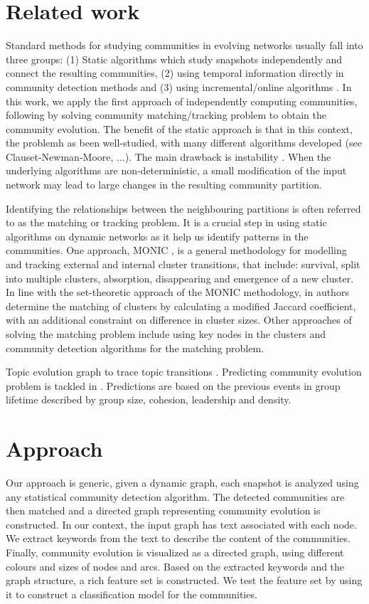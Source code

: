 \documentclass{article} %
\begin{document}
\section{Related work}
Standard methods for studying communities in evolving networks usually fall into three groups: (1) Static algorithms which study snapshots independently  and connect the resulting communities, (2) using temporal information directly in community detection methods and (3) using incremental/online algorithms \cite{aynaud}. In this work, we apply the first approach of independently computing communities, following by solving community matching/tracking problem to obtain the community evolution. The benefit of  the static approach is that in this context, the problemh as been  well-studied, with many different algorithms developed (see Clauset-Newman-Moore\cite{clauset-newman-moore}, ...). The main drawback is  instability \cite{aynaud2010}. When the underlying algorithms are  non-deterministic, a small modification of the input network may lead to large changes in the resulting community partition.
 
Identifying the relationships between the neighbouring partitions is often referred to as the matching or tracking problem. It is a crucial step in using static algorithms on dynamic networks as it help us identify patterns in the communities. One approach, MONIC \cite{spiliopoulou}, is a general methodology for modelling and tracking external and internal cluster transitions, that include: survival, split into multiple clusters, absorption, disappearing and emergence of a new cluster. In line with the set-theoretic approach of  the MONIC methodology, in \cite{gliwa2013} authors determine the  matching of clusters by calculating a modified Jaccard coefficient, with an additional constraint on difference in cluster sizes. Other approaches of solving the matching problem include using key nodes in the clusters \cite{wang} and community detection algorithms for the matching problem\cite{palla}.

Topic evolution graph to trace topic transitions \cite{mei2005}.
Predicting community evolution problem is tackled in \cite{gliwa2013}. Predictions are based on the previous events in group lifetime described by group size, cohesion, leadership and density.

\section{Approach}
Our approach is generic,  given a dynamic graph, each snapshot is analyzed using any statistical community detection algorithm. The detected communities are then matched and a directed graph representing community evolution is constructed. In our context, the input graph has text associated with each node. We extract keywords from the text 
 to describe the content of the communities. Finally, community evolution is visualized as a directed graph, using different colours and sizes of nodes and arcs.  Based on the extracted keywords and the graph structure, a rich feature set is constructed. We test the feature set by using it to construct a classification model for the communities.  
\end{document}

